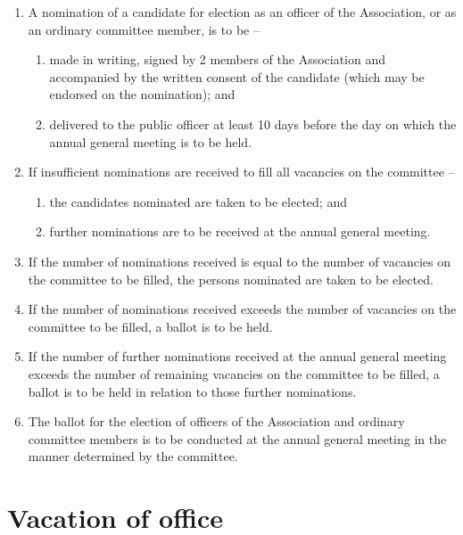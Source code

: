 \documentclass[a4paper,11pt]{article}
\begin{document}
\begin{enumerate}
	\item A nomination of a candidate for election as an officer of the Association, or as an ordinary committee member, is to be --
	\begin{enumerate}
		\item made in writing, signed by 2 members of the Association and accompanied by the written consent of the candidate (which may be endorsed on the nomination); and
		\item delivered to the public officer at least 10 days before the day on which the annual general meeting is to be held.
	\end{enumerate}
	
	\item If insufficient nominations are received to fill all vacancies on the committee --
	\begin{enumerate}
		\item the candidates nominated are taken to be elected; and
		\item further nominations are to be received at the annual general meeting.
	\end{enumerate}
	
	\item If the number of nominations received is equal to the number of vacancies on the committee to be filled, the persons nominated are taken to be elected.
	\item If the number of nominations received exceeds the number of vacancies on the committee to be filled, a ballot is to be held.
	\item If the number of further nominations received at the annual general meeting exceeds the number of remaining vacancies on the committee to be filled, a ballot is to be held in relation to those further nominations.
	\item The ballot for the election of officers of the Association and ordinary committee members is to be conducted at the annual general meeting in the manner determined by the committee.
\end{enumerate}

\section{Vacation of office}
\label{rule:vacation}
\end{document}
